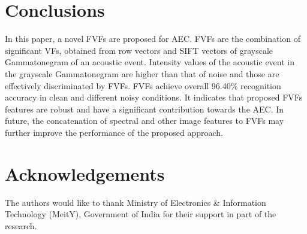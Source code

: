 \documentclass[a4paper]{article}
\begin{document}
\section{Conclusions}
\label{sec:majhead}

In this paper, a novel FVFs are proposed for AEC.
FVFs are the combination of significant VFs, obtained from
row vectors and SIFT vectors of grayscale Gammatonegram of an acoustic event. Intensity values of the acoustic event in the grayscale Gammatonegram are higher than that of noise and those are effectively discriminated by FVFs.
FVFs achieve overall 96.40\% recognition accuracy in
clean and different noisy conditions. It indicates that proposed
FVFs features are robust and have a significant contribution
towards the AEC. In future, the concatenation of spectral
and other image features to FVFs may further improve
the performance of the proposed approach.

\section{Acknowledgements}
The authors would like to thank Ministry of Electronics \& Information Technology (MeitY), Government of India for their support in part of the research.







\end{document}
